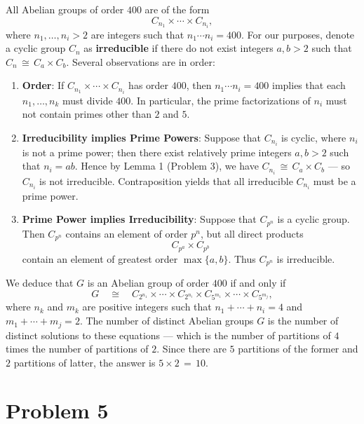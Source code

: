 \documentclass[11pt]{article}
\begin{document}
All Abelian groups of order $400$ are of the form
\[
  C_{n_{1}} \times \cdots \times C_{n_{i}},
\]
where $n_{1}, \ldots, n_{i} > 2$ are integers such that $n_{1} \cdots n_{i} = 400$. For our purposes, denote a cyclic group $C_{n}$ as \textbf{irreducible} if there do not exist integers $a, b > 2$ such that $C_{n} \, \cong \, C_{a} \times C_{b}$. Several observations are in order:
\begin{enumerate}
  \item \textbf{Order}: If $C_{n_{1}} \times \cdots \times C_{n_{i}}$ has order $400$, then $n_{1} \cdots n_{i} = 400$ implies that each $n_{1}, \ldots, n_{k}$ must divide $400$. In particular, the prime factorizations of $n_{i}$ must not contain primes other than $2$ and $5$.
  \item \textbf{Irreducibility implies Prime Powers}: Suppose that $C_{n_{i}}$ is cyclic, where $n_{i}$ is not a prime power; then there exist relatively prime integers $a, b > 2$ such that $n_{i} = ab$. Hence by Lemma 1 (Problem 3), we have $C_{n_{i}} \, \cong \, C_{a} \times C_{b}$ --- so $C_{n_{i}}$ is not irreducible. Contraposition yields that all irreducible $C_{n_{i}}$ must be a prime power.

  \item \textbf{Prime Power implies Irreducibility}: Suppose that $C_{p^{n}}$ is a cyclic group. Then $C_{p^{n}}$ contains an element of order $p^{n}$, but all direct products
  \[
    C_{p^{a}} \times C_{p^{b}}
  \]
  contain an element of greatest order $\max \{ a, b \}$. Thus $C_{p^{n}}$ is irreducible.
\end{enumerate}
We deduce that $G$ is an Abelian group of order $400$ if and only if
\[
  G \quad \cong \quad C_{2^{n_{1}}} \times \cdots \times  C_{2^{n_{i}}} \times C_{5^{m_{1}}} \times \cdots \times C_{5^{m_{j}}},
\]
where $n_{k}$ and $m_{k}$ are positive integers such that $n_{1} + \cdots + n_{i} = 4$ and $m_{1} + \cdots + m_{j} = 2$. The number of distinct Abelian groups $G$ is the number of distinct solutions to these equations --- which is the number of partitions of $4$ times the number of partitions of $2$. Since there are $5$ partitions of the former and $2$ partitions of latter, the answer is $5 \times 2 \, = \, \boxed{10}$.


\section{Problem 5}
\end{document}
